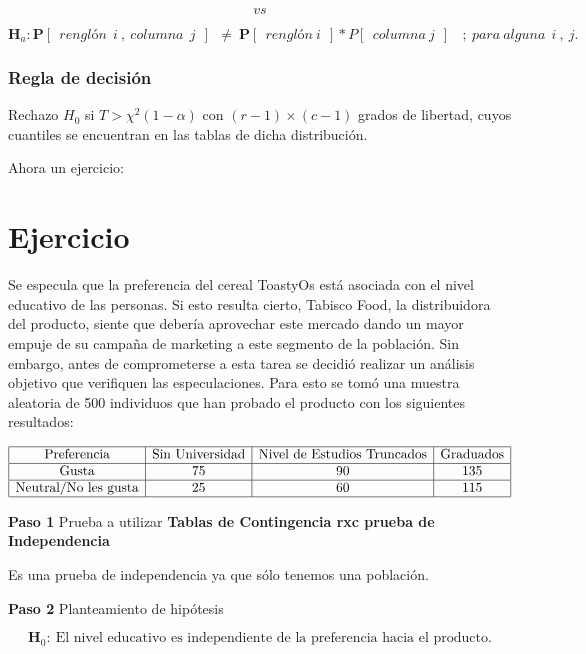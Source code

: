 \documentclass[
  a4paper,
  oneside,
  openany]{book}
\begin{document}
\[vs\]

\[\textbf{H}_a:\mathbf{P}[\ \ renglón\ \ i\ ,\ columna\ \ j\ \ ]\ \  \neq \ \mathbf{P}[ \ \ renglón\ i\ \ ]*P[\ \ columna\ j\ \  ]\ \ \ \ ; \ para\ alguna\ \ i \ , \ j. \ \]

\hypertarget{regla-de-decisiuxf3n-24}{%
\subsubsection*{Regla de decisión}\label{regla-de-decisiuxf3n-24}}


Rechazo \(H_0\) si \(T> \chi^2(1-\alpha)\) con \((r-1)\times(c-1)\) grados de libertad, cuyos cuantiles se encuentran en las tablas de dicha distribución.

Ahora un ejercicio:

\hypertarget{ejercicio}{%
\section{Ejercicio}\label{ejercicio}}

Se especula que la preferencia del cereal ToastyOs está asociada con el nivel educativo de las
personas. Si esto resulta cierto, Tabisco Food, la distribuidora del producto, siente que debería
aprovechar este mercado dando un mayor empuje de su campaña de marketing a este segmento
de la población. Sin embargo, antes de comprometerse a esta tarea se decidió realizar un análisis
objetivo que verifiquen las especulaciones. Para esto se tomó una muestra aleatoria de 500
individuos que han probado el producto con los siguientes resultados:

\[
\begin{array}{|c|c|c|c|} 
\hline
\mbox{Preferencia}& \mbox{Sin Universidad}&\mbox{Nivel de Estudios Truncados}&\mbox{Graduados}\\
\hline
\mbox{Gusta}& 75&90&135\\
\hline
\mbox{Neutral/No les gusta}& 25&60&115\\
\hline
\end {array}
\]

\textbf{Paso 1} Prueba a utilizar \textbf{Tablas de Contingencia rxc prueba de Independencia}

Es una prueba de independencia ya que sólo tenemos una población.

\textbf{Paso 2} Planteamiento de hipótesis

\[\textbf{H}_0: \ \mbox{El nivel educativo es independiente de la preferencia hacia el producto.}\]
\end{document}
